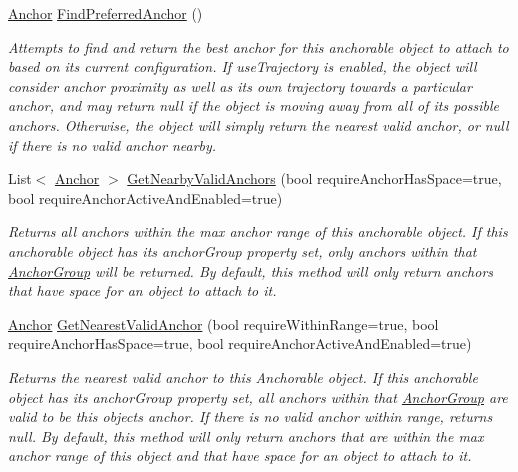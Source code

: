 \begin{DoxyCompactItemize}
\mbox{\hyperlink{class_leap_1_1_unity_1_1_interaction_1_1_anchor}{Anchor}} \mbox{\hyperlink{class_leap_1_1_unity_1_1_interaction_1_1_anchorable_behaviour_a1ec7edef87a35f76a8ffc601ce1b615a}{Find\+Preferred\+Anchor}} ()
\begin{DoxyCompactList}\small\item\em Attempts to find and return the best anchor for this anchorable object to attach to based on its current configuration. If use\+Trajectory is enabled, the object will consider anchor proximity as well as its own trajectory towards a particular anchor, and may return null if the object is moving away from all of its possible anchors. Otherwise, the object will simply return the nearest valid anchor, or null if there is no valid anchor nearby. \end{DoxyCompactList}\item 
List$<$ \mbox{\hyperlink{class_leap_1_1_unity_1_1_interaction_1_1_anchor}{Anchor}} $>$ \mbox{\hyperlink{class_leap_1_1_unity_1_1_interaction_1_1_anchorable_behaviour_a5a5c9e551804405da221dd9bdc3b9e42}{Get\+Nearby\+Valid\+Anchors}} (bool require\+Anchor\+Has\+Space=true, bool require\+Anchor\+Active\+And\+Enabled=true)
\begin{DoxyCompactList}\small\item\em Returns all anchors within the max anchor range of this anchorable object. If this anchorable object has its anchor\+Group property set, only anchors within that \mbox{\hyperlink{class_leap_1_1_unity_1_1_interaction_1_1_anchor_group}{Anchor\+Group}} will be returned. By default, this method will only return anchors that have space for an object to attach to it. \end{DoxyCompactList}\item 
\mbox{\hyperlink{class_leap_1_1_unity_1_1_interaction_1_1_anchor}{Anchor}} \mbox{\hyperlink{class_leap_1_1_unity_1_1_interaction_1_1_anchorable_behaviour_a34daac6bf30d498a6df3c847124dd219}{Get\+Nearest\+Valid\+Anchor}} (bool require\+Within\+Range=true, bool require\+Anchor\+Has\+Space=true, bool require\+Anchor\+Active\+And\+Enabled=true)
\begin{DoxyCompactList}\small\item\em Returns the nearest valid anchor to this Anchorable object. If this anchorable object has its anchor\+Group property set, all anchors within that \mbox{\hyperlink{class_leap_1_1_unity_1_1_interaction_1_1_anchor_group}{Anchor\+Group}} are valid to be this object\textquotesingle{}s anchor. If there is no valid anchor within range, returns null. By default, this method will only return anchors that are within the max anchor range of this object and that have space for an object to attach to it. \end{DoxyCompactList}\item 

\end{DoxyCompactItemize}
